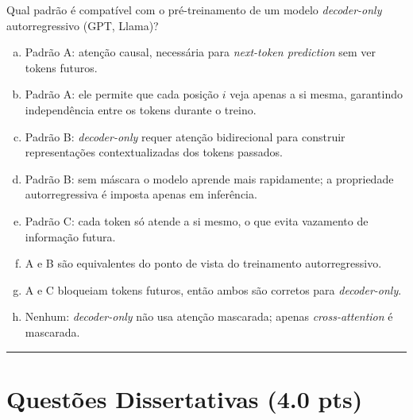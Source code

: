 \documentclass[11pt,a4paper]{article}
\begin{document}
\begin{enumerate}[1)]
Qual padrão é compatível com o pré-treinamento de um modelo \textit{decoder-only} autorregressivo (GPT, Llama)?
\begin{enumerate}[a)]
    \item Padrão A: atenção causal, necessária para \textit{next-token prediction} sem ver tokens futuros.
    \item Padrão A: ele permite que cada posição $i$ veja apenas a si mesma, garantindo independência entre os tokens durante o treino.
    \item Padrão B: \textit{decoder-only} requer atenção bidirecional para construir representações contextualizadas dos tokens passados.
    \item Padrão B: sem máscara o modelo aprende mais rapidamente; a propriedade autorregressiva é imposta apenas em inferência.
    \item Padrão C: cada token só atende a si mesmo, o que evita vazamento de informação futura.
    \item A e B são equivalentes do ponto de vista do treinamento autorregressivo.
    \item A e C bloqueiam tokens futuros, então ambos são corretos para \textit{decoder-only}.
    \item Nenhum: \textit{decoder-only} não usa atenção mascarada; apenas \textit{cross-attention} é mascarada.
\end{enumerate}

\end{enumerate}

\rule{\linewidth}{0.4pt}

\pagebreak
\section*{Questões Dissertativas (4.0 pts)}
\end{document}
